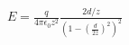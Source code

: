 \documentclass[preview]{standalone}
\begin{document}
\begin{align*}
E = \frac{q}{4\pi\epsilon_{0}z^{2}} \frac{2d/z}{(1-(\frac{d}{2z})^{2})^{2}}
\end{align*}
\end{document}
